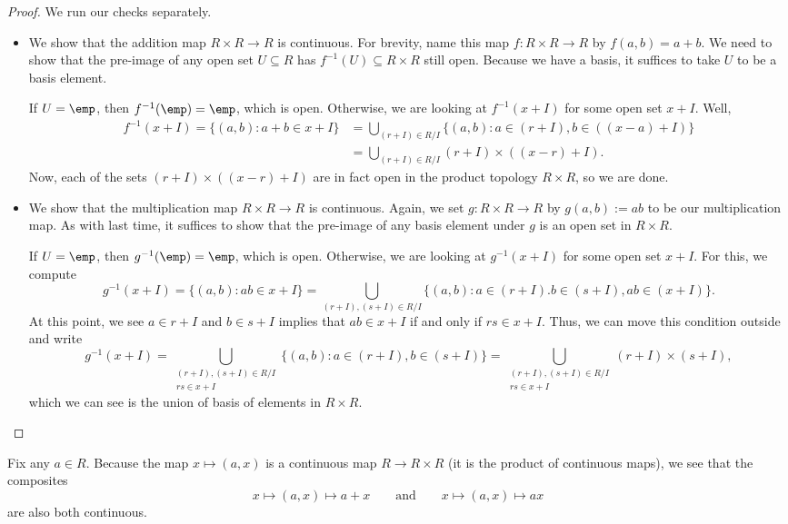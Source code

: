 \begin{proof}
	We run our checks separately.
	\begin{itemize}
		\item We show that the addition map $R\times R\to R$ is continuous. For brevity, name this map $f:R\times R\to R$ by $f(a,b)=a+b$. We need to show that the pre-image of any open set $U\subseteq R$ has $f^{-1}(U)\subseteq R\times R$ still open. Because we have a basis, it suffices to take $U$ to be a basis element.

		If $U=\emp$, then $f^{-1}(\emp)=\emp$, which is open. Otherwise, we are looking at $f^{-1}(x+I)$ for some open set $x+I$. Well,
		\begin{align*}
			f^{-1}(x+I)=\{(a,b):a+b\in x+I\} &= \bigcup_{(r+I)\in R/I}\{(a,b):a\in (r+I),b\in((x-a)+I)\} \\
			&= \bigcup_{(r+I)\in R/I}(r+I)\times((x-r)+I).
		\end{align*}
		Now, each of the sets $(r+I)\times((x-r)+I)$ are in fact open in the product topology $R\times R$, so we are done.

		\item We show that the multiplication map $R\times R\to R$ is continuous. Again, we set $g:R\times R\to R$ by $g(a,b):=ab$ to be our multiplication map. As with last time, it suffices to show that the pre-image of any basis element under $g$ is an open set in $R\times R$.

		If $U=\emp$, then $g^{-1}(\emp)=\emp$, which is open. Otherwise, we are looking at $g^{-1}(x+I)$ for some open set $x+I$. For this, we compute
		\[g^{-1}(x+I)=\{(a,b):ab\in x+I\}=\bigcup_{(r+I),(s+I)\in R/I}\{(a,b):a\in(r+I).b\in (s+I),ab\in (x+I)\}.\]
		At this point, we see $a\in r+I$ and $b\in s+I$ implies that $ab\in x+I$ if and only if $rs\in x+I$. Thus, we can move this condition outside and write
		\[g^{-1}(x+I)=\bigcup_{\substack{(r+I),(s+I)\in R/I\\rs\in x+I}}\{(a,b):a\in (r+I),b\in (s+I)\}=\bigcup_{\substack{(r+I),(s+I)\in R/I\\rs\in x+I}}(r+I)\times(s+I),\]
		which we can see is the union of basis of elements in $R\times R$.
		\qedhere
	\end{itemize}
\end{proof}
\begin{remark} \label{rem:krulladdandmultcont}
	Fix any $a\in R$. Because the map $x\mapsto(a,x)$ is a continuous map $R\to R\times R$ (it is the product of continuous maps), we see that the composites
	\[x\mapsto(a,x)\mapsto a+x\qquad\text{and}\qquad x\mapsto(a,x)\mapsto ax\]
	are also both continuous.
\end{remark}
